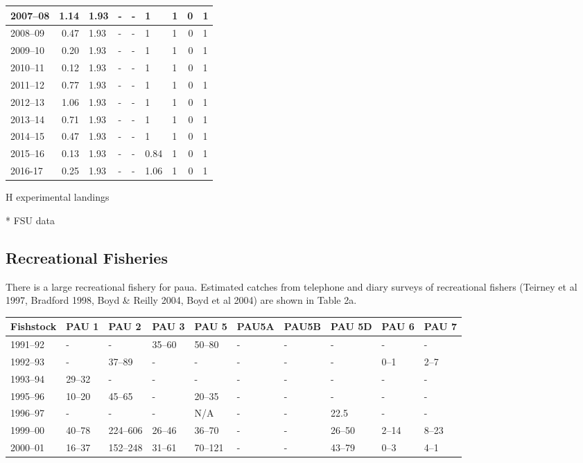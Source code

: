 \documentclass{mpi-plenary}
\theoremstyle{definition}
\theoremstyle{definition}
\theoremstyle{definition}
\theoremstyle{remark}
\begin{document}
\begin{tabular}{l|r|l|l|l|l|l|r|l}
2007–08 & 1.14 & 1.93 & - & - & 1 & 1 & 0 & 1\\
\hline
2008–09 & 0.47 & 1.93 & - & - & 1 & 1 & 0 & 1\\
\hline
2009–10 & 0.20 & 1.93 & - & - & 1 & 1 & 0 & 1\\
\hline
2010–11 & 0.12 & 1.93 & - & - & 1 & 1 & 0 & 1\\
\hline
2011–12 & 0.77 & 1.93 & - & - & 1 & 1 & 0 & 1\\
\hline
2012–13 & 1.06 & 1.93 & - & - & 1 & 1 & 0 & 1\\
\hline
2013–14 & 0.71 & 1.93 & - & - & 1 & 1 & 0 & 1\\
\hline
2014–15 & 0.47 & 1.93 & - & - & 1 & 1 & 0 & 1\\
\hline
2015–16 & 0.13 & 1.93 & - & - & 0.84 & 1 & 0 & 1\\
\hline
2016-17 & 0.25 & 1.93 & - & - & 1.06 & 1 & 0 & 1\\
\hline
\end{tabular}

H experimental landings

* FSU data

\subsection{Recreational Fisheries}\label{recreational-fisheries}

There is a large recreational fishery for paua. Estimated catches from
telephone and diary surveys of recreational fishers (Teirney et al 1997,
Bradford 1998, Boyd \& Reilly 2004, Boyd et al 2004) are shown in Table
2a.

\begin{tabular}{l|l|l|l|l|l|l|l|l|l}
\hline
Fishstock & PAU 1 & PAU 2 & PAU 3 & PAU 5 & PAU5A & PAU5B & PAU 5D & PAU 6 & PAU 7\\
\hline
1991–92 & - & - & 35–60 & 50–80 & - & - & - & - & -\\
\hline
1992–93 & - & 37–89 & - & - & - & - & - & 0–1 & 2–7\\
\hline
1993–94 & 29–32 & - & - & - & - & - & - & - & -\\
\hline
1995–96 & 10–20 & 45–65 & - & 20–35 & - & - & - & - & -\\
\hline
1996–97 & - & - & - & N/A & - & - & 22.5 & - & -\\
\hline
1999–00 & 40–78 & 224–606 & 26–46 & 36–70 & - & - & 26–50 & 2–14 & 8–23\\
\hline
2000–01 & 16–37 & 152–248 & 31–61 & 70–121 & - & - & 43–79 & 0–3 & 4–1\\
\hline
\end{tabular}
\end{document}
